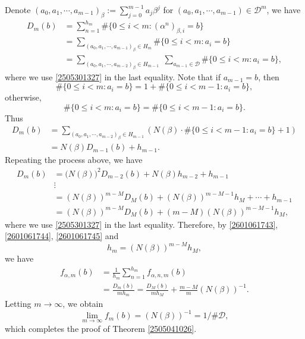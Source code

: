 \documentclass[12pt]{amsart}
\theoremstyle{plain}
\theoremstyle{definition}
\theoremstyle{remark}
\numberwithin{equation}{section}
\begin{document}
	Denote $(a_0, a_1,\cdots, a_{m-1})_{\beta}:=\sum_{j=0}^{m-1}a_j\beta^j$ for $(a_0, a_1,\cdots, a_{m-1})\in\mathcal{D}^m$, we have
	\[
	\begin{split}
		D_{m}(b)& = \sum_{n=1}^{h_m} \#\{0 \leq i < m :  (\alpha^n)_{\beta,i} = b\}\\
		&= \sum_{(a_0, a_1,\cdots, a_{m-1})_{\beta} \in H_m} \#\{0 \leq i < m :  a_i = b\}\\
		&=\sum_{(a_0, a_1,\cdots, a_{m-2})_{\beta} \in H_{m-1}}\;\sum_{a_{m-1} \in \mathcal D} \#\{ 0 \leq i < m : a_i = b\}, 
	\end{split}
	\]
	where we use \eqref{2505301327} in the last equality. Note that if $a_{m-1}=b$, then $$\#\{ 0 \leq i < m : a_i = b\}=1+\#\{ 0 \leq i < m-1 : a_i = b\},$$
	otherwise, $$\#\{ 0 \leq i < m : a_i = b\}=\#\{ 0 \leq i < m-1 : a_i = b\}.$$ Thus 
	\[
	\begin{split}
		D_{m}(b)&=\sum_{(a_0, a_1,\cdots, a_{m-2})_{\beta} \in H_{m-1}}(N(\beta)\cdot  \#\{ 0 \leq i < m-1 : a_i = b\}+1)\\
		&= N(\beta) D_{m-1}(b) + h_{m-1}.
	\end{split}
	\]
	Repeating the process above, we have
	\begin{equation}\label{2601061745}
		\begin{split}
			D_{m}(b)
			&= \big(N(\beta)\big)^2  D_{m-2}(b) + N(\beta) h_{m-2} + h_{m-1}\\
			&\vdots \\
			&= (N(\beta))^{m-M}  D_{M}(b) + (N(\beta))^{m-M-1} h_{M} + \cdots + h_{m-1}\\
			&= (N(\beta))^{m-M} D_{M}(b) + (m - M) (N(\beta))^{m-M-1} h_{M},
		\end{split}
	\end{equation}
	where we use \eqref{2505301327} in the last equality.
	Therefore, by \eqref{2601061743}, \eqref{2601061744}, \eqref{2601061745} and 
	\[ h_m = (N(\beta))^{m-M} h_{M},\]
	we have
	\[
	\begin{split}
		f_{\alpha,m}(b)&=\frac{1}{h_m}\sum_{n=1}^{h_m}f_{\alpha,n,m}(b)\\
		&=\frac{D_{m}(b)}{mh_m} = \frac{D_{M}(b)}{mh_M} + \frac{m - M}{m} (N(\beta))^{-1}.
	\end{split} 
	\]  Letting \( m \to \infty \), we obtain 
	\[\lim_{m \to \infty}f_m(b) = (N(\beta))^{-1} = 1/\#\mathcal{D},\] which completes the proof of Theorem \ref{2505041026}.
	
\end{document}

